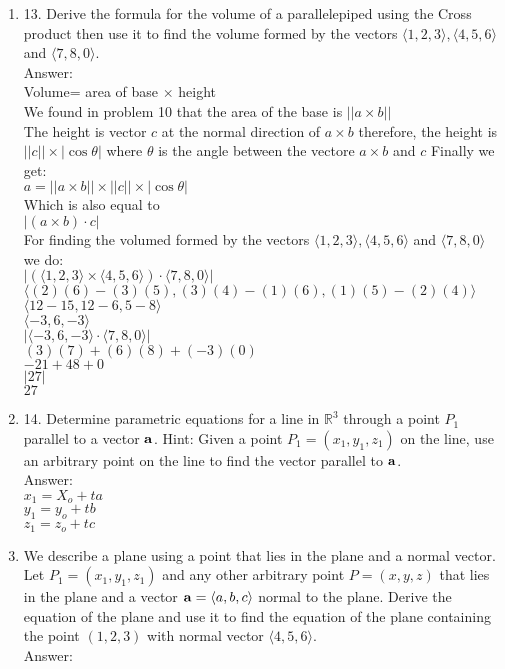 \documentclass[11pt]{article}
\newcommand{\R}{\ensuremath{\mathbb R}}
\begin{document}
\begin{enumerate}
 \item 13. Derive the formula for the volume of a parallelepiped using the Cross product then use it to find the volume formed by the vectors $\langle 1, 2, 3 \rangle, \langle 4, 5, 6 \rangle$ and $\langle 7, 8, 0 \rangle$.
 \\
 Answer:
 \\
 Volume= area of base $\times$ height
 \\
 We found in problem 10 that the area of the base is $||a \times b||$
 \\
 The height is vector $c$ at the normal direction of $a \times b$ therefore, the height is $||c|| \times |\cos \theta|$ where $\theta$ is the angle between the vectore $a \times b$ and $c$
 Finally we get:
 \\
 $a=||a \times b|| \times ||c|| \times |\cos \theta|$
 \\
 Which is also equal to 
 \\
 $|(a \times b) \cdot c|$ 
 \\
 For finding the volumed formed by the vectors $\langle 1, 2, 3 \rangle, \langle 4, 5, 6 \rangle$ and $\langle 7, 8, 0 \rangle$ we do:
 \\
 $|(\langle 1, 2, 3 \rangle \times \langle 4, 5, 6 \rangle) \cdot \langle 7, 8, 0 \rangle|$
 \\
 $\langle (2)(6)-(3)(5), (3)(4)-(1)(6), (1)(5)-(2)(4)\rangle$
 \\
 $\langle 12-15, 12-6, 5-8 \rangle$
 \\
 $\langle -3,6,-3 \rangle$
 \\
 $|\langle -3,6,-3 \rangle \cdot \langle 7, 8, 0 \rangle|$
 \\
 $(3)(7)+(6)(8)+(-3)(0) $
 \\
 $-21+48+0 $
 \\
 $|27|$
 \\
 $27$
 
 
 \item 14. Determine parametric equations for a line in $\R^3$ through a point $P_1$ parallel to a vector ${\bf a}$.  Hint: Given a point $P_1=(x_1, y_1, z_1)$ on the line, use an arbitrary point on the line to find the vector parallel to ${\bf a}$. 
 \\
 Answer:
 \\
 $x_1= X_o + ta$
 \\
 $y_1=y_o+ tb$
 \\
 $z_1=z_o+tc$
 
 \item We describe a plane using a point that lies in the plane and a normal vector.  Let $P_1=(x_1, y_1, z_1)$ and any other arbitrary point $P=(x,y,z)$ that lies in the plane and a vector ${\bf a} = \langle a, b, c \rangle$ normal to the plane.  Derive the equation of the plane and use it to find the equation of the plane containing the point $(1, 2, 3)$ with normal vector $\langle 4, 5, 6 \rangle$.   
 \\
 Answer:


\end{enumerate}
\end{document}
